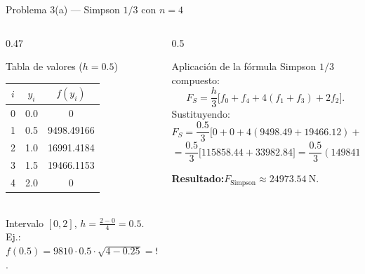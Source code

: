 \documentclass[aspectratio=169,10pt]{beamer}
\begin{document}
\begin{frame}{Problema 3(a) — Simpson $1/3$ con $n=4$}
\begin{columns}[T]
\begin{column}{0.47\textwidth}
\begin{cardgear}{Tabla de valores ($h=0.5$)}{\faTable}
\centering
{\footnotesize\renewcommand{\arraystretch}{1.25}\setlength{\tabcolsep}{6pt}
\begin{tabular}{c|c|c}
$i$ & $y_i$ & $f(y_i)$\\\hline
0 & 0.0 & 0\\
1 & 0.5 & 9498.49166\\
2 & 1.0 & 16991.4184\\
3 & 1.5 & 19466.1153\\
4 & 2.0 & 0\\
\end{tabular}}\\[1.2mm]
{\footnotesize Intervalo $[0,2]$, $h=\tfrac{2-0}{4}=0.5$.\\[0.4mm]
Ej.: $f(0.5)=9810\cdot0.5\cdot\sqrt{4-0.25}=9498.49$.}
\end{cardgear}
\end{column}
\begin{column}{0.5\textwidth}
\begin{cardgear}{Aplicación de la fórmula}{\faCalculator}
{\footnotesize Simpson $1/3$ compuesto:
\[
F_S=\frac h3\big[f_0+f_4+4(f_1+f_3)+2f_2\big].
\]
Sustituyendo:
\[
F_S=\frac{0.5}{3}\big[0+0+4(9498.49+19466.12)+2(16991.42)\big]
\]
\[
=\frac{0.5}{3}\big[115858.44+33982.84\big]=\frac{0.5}{3}(149841.28).
\]}
\end{cardgear}
\vspace{1mm}
\begin{cardnota}[\faCheckCircle]
{\footnotesize \textbf{Resultado:}\quad $F_{\text{Simpson}}\approx 24973.54\ \text{N}$.}
\end{cardnota}
\end{column}
\end{columns}
\end{frame}
\end{document}

